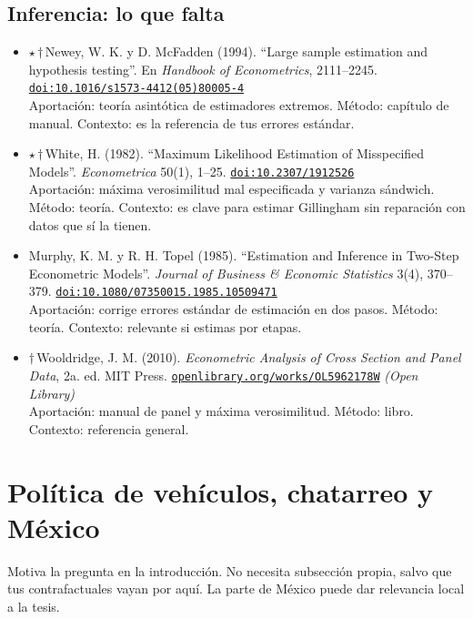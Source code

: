 \documentclass[11pt]{article}
\begin{document}
\subsection*{Inferencia: lo que falta}
\begin{itemize}
\item $\star$\,$\dagger$\,Newey, W. K. y D. McFadden (1994). ``Large sample estimation and hypothesis testing''. En \textit{Handbook of Econometrics}, 2111--2245. \href{https://doi.org/10.1016/s1573-4412(05)80005-4}{\texttt{doi:10.1016/s1573-4412(05)80005-4}}\\
Aportación: teoría asintótica de estimadores extremos. Método: capítulo de manual. Contexto: es la referencia de tus errores estándar.
\item $\star$\,$\dagger$\,White, H. (1982). ``Maximum Likelihood Estimation of Misspecified Models''. \textit{Econometrica} 50(1), 1--25. \href{https://doi.org/10.2307/1912526}{\texttt{doi:10.2307/1912526}}\\
Aportación: máxima verosimilitud mal especificada y varianza sándwich. Método: teoría. Contexto: es clave para estimar Gillingham sin reparación con datos que sí la tienen.
\item Murphy, K. M. y R. H. Topel (1985). ``Estimation and Inference in Two-Step Econometric Models''. \textit{Journal of Business \& Economic Statistics} 3(4), 370--379. \href{https://doi.org/10.1080/07350015.1985.10509471}{\texttt{doi:10.1080/07350015.1985.10509471}}\\
Aportación: corrige errores estándar de estimación en dos pasos. Método: teoría. Contexto: relevante si estimas por etapas.
\item $\dagger$\,Wooldridge, J. M. (2010). \textit{Econometric Analysis of Cross Section and Panel Data}, 2a. ed. MIT Press. \href{https://openlibrary.org/works/OL5962178W}{\texttt{openlibrary.org/works/OL5962178W}} \textit{(Open Library)}\\
Aportación: manual de panel y máxima verosimilitud. Método: libro. Contexto: referencia general.
\end{itemize}

\section{Política de vehículos, chatarreo y México}
Motiva la pregunta en la introducción. No necesita subsección propia, salvo que tus contrafactuales vayan por aquí. La parte de México puede dar relevancia local a la tesis.
\end{document}
